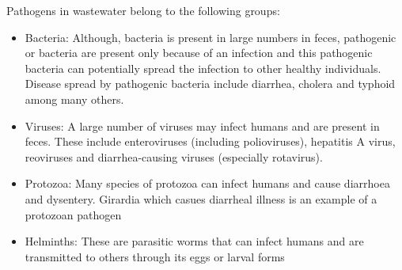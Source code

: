 \begin{enumerate}[1.]
	
				Pathogens in wastewater belong to the following groups:
				\begin{itemize}
					\item Bacteria:  Although, bacteria is present in large numbers in feces, pathogenic or bacteria are present only because of an infection and this pathogenic bacteria can potentially spread the infection to other healthy individuals.  Disease spread by pathogenic bacteria include diarrhea, cholera and typhoid among many others.
					      
					\item Viruses: A large number of viruses may infect humans and are present in feces.  These include enteroviruses (including polioviruses), hepatitis A virus, reoviruses and diarrhea-causing viruses (especially rotavirus).
					      
					\item Protozoa:  Many species of protozoa can infect humans and cause diarrhoea and dysentery. Girardia which casues diarrheal illness is an example of a protozoan pathogen
					      
					\item Helminths:  These are parasitic worms that can infect humans and are transmitted to others through its eggs or larval forms
					      
				\end{itemize}
				

\end{enumerate}
